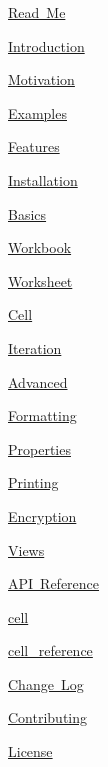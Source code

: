 
\begin{DoxyItemize}
\item \mbox{\hyperlink{third-party_2pybind11_2_r_e_a_d_m_e_8md}{Read Me}}
\item \mbox{\hyperlink{docs_2introduction_2_r_e_a_d_m_e_8md}{Introduction}}
\begin{DoxyItemize}
\item \mbox{\hyperlink{_motivation_8md}{Motivation}}
\item \mbox{\hyperlink{_examples_8md}{Examples}}
\item \mbox{\hyperlink{_features_8md}{Features}}
\item \mbox{\hyperlink{_installation_8md}{Installation}}
\end{DoxyItemize}
\item \mbox{\hyperlink{docs_2basics_2_r_e_a_d_m_e_8md}{Basics}}
\begin{DoxyItemize}
\item \mbox{\hyperlink{_workbook_8md}{Workbook}}
\item \mbox{\hyperlink{_worksheet_8md}{Worksheet}}
\item \mbox{\hyperlink{basics_2cell_8md}{Cell}}
\item \mbox{\hyperlink{_iteration_8md}{Iteration}}
\end{DoxyItemize}
\item \mbox{\hyperlink{docs_2advanced_2_r_e_a_d_m_e_8md}{Advanced}}
\begin{DoxyItemize}
\item \mbox{\hyperlink{_formatting_8md}{Formatting}}
\item \mbox{\hyperlink{_properties_8md}{Properties}}
\item \mbox{\hyperlink{_printing_8md}{Printing}}
\item \mbox{\hyperlink{_encryption_8md}{Encryption}}
\item \mbox{\hyperlink{_views_8md}{Views}}
\end{DoxyItemize}
\item \mbox{\hyperlink{docs_2api_2_r_e_a_d_m_e_8md}{API Reference}}
\begin{DoxyItemize}
\item \mbox{\hyperlink{api_2cell_8md}{cell}}
\item \mbox{\hyperlink{cell__reference_8md}{cell\+\_\+reference}}
\end{DoxyItemize}
\item \mbox{\hyperlink{_c_h_a_n_g_e_l_o_g_8md}{Change Log}}
\item \mbox{\hyperlink{third-party_2pybind11_2_c_o_n_t_r_i_b_u_t_i_n_g_8md}{Contributing}}
\item \mbox{\hyperlink{_l_i_c_e_n_s_e_8md}{License}} 
\end{DoxyItemize}